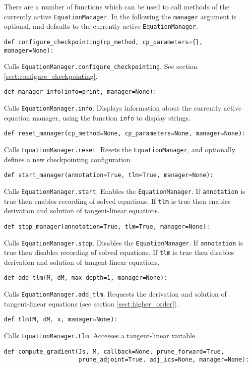 \documentclass[11pt]{article}
\begin{document}
There are a number of functions which can be used to call methods of the
currently active \texttt{EquationManager}. In the following the
\texttt{manager} argument is optional, and defaults to the currently active
\texttt{EquationManager}.
\begin{lstlisting}
def configure_checkpointing(cp_method, cp_parameters={}, manager=None):
\end{lstlisting}
Calls \texttt{EquationManager.configure\_checkpointing}. See section
\ref{sect:configure_checkpointing}.
\begin{lstlisting}
def manager_info(info=print, manager=None):
\end{lstlisting}
Calls \texttt{EquationManager.info}. Displays information about the currently
active equation manager, using the function \texttt{info} to display strings.
\begin{lstlisting}
def reset_manager(cp_method=None, cp_parameters=None, manager=None):
\end{lstlisting}
Calls \texttt{EquationManager.reset}. Resets the \texttt{EquationManager}, and
optionally defines a new checkpointing configuration.
\begin{lstlisting}
def start_manager(annotation=True, tlm=True, manager=None):
\end{lstlisting}
Calls \texttt{EquationManager.start}. Enables the \texttt{EquationManager}. If
\texttt{annotation} is true then enables recording of solved equations. If
\texttt{tlm} is true then enables derivation and solution of tangent-linear
equations.
\begin{lstlisting}
def stop_manager(annotation=True, tlm=True, manager=None):
\end{lstlisting}
Calls \texttt{EquationManager.stop}. Disables the \texttt{EquationManager}. If
\texttt{annotation} is true then disables recording of solved equations. If
\texttt{tlm} is true then disables derivation and solution of tangent-linear
equations.
\begin{lstlisting}
def add_tlm(M, dM, max_depth=1, manager=None):
\end{lstlisting}
Calls \texttt{EquationManager.add\_tlm}. Requests the derivation and solution
of tangent-linear equations (see section \ref{sect:higher_order}).
\begin{lstlisting}
def tlm(M, dM, x, manager=None):
\end{lstlisting}
Calls \texttt{EquationManager.tlm}. Accesses a tangent-linear variable.
\begin{lstlisting}
def compute_gradient(Js, M, callback=None, prune_forward=True,
                     prune_adjoint=True, adj_ics=None, manager=None):
\end{lstlisting}
\end{document}
